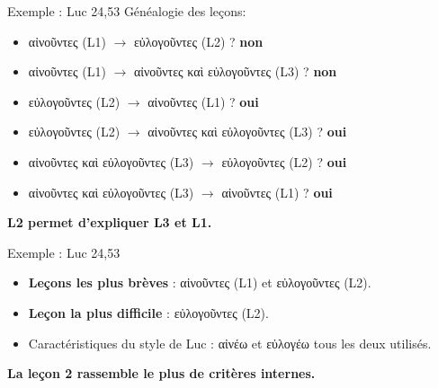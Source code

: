 \documentclass[11pt]{beamer}
\begin{document}
\begin{frame}{Exemple : Luc 24,53}
Généalogie des leçons:
    \begin{itemize}
        \item \textgreek{αἰνοῦντες} (L1) $\rightarrow$ \textgreek{εὐλογοῦντες} (L2) ? \pause
        \textbf{non}
        
        \item \textgreek{αἰνοῦντες} (L1) $\rightarrow$ \textgreek{αἰνοῦντες καὶ εὐλογοῦντες} (L3) ?
        \pause
        \textbf{non}
        
        \item \textgreek{εὐλογοῦντες} (L2) $\rightarrow$ \textgreek{αἰνοῦντες} (L1) ?
        \pause
        \textbf{oui}
        
        \item \textgreek{εὐλογοῦντες} (L2) $\rightarrow$ \textgreek{αἰνοῦντες καὶ εὐλογοῦντες} (L3) ?
        \pause 
        \textbf{oui}

        \item \textgreek{αἰνοῦντες καὶ εὐλογοῦντες} (L3) $\rightarrow$ \textgreek{εὐλογοῦντες} (L2) ?
        \pause
        \textbf{oui}
        
        
        \item \textgreek{αἰνοῦντες καὶ εὐλογοῦντες} (L3) $\rightarrow$ \textgreek{αἰνοῦντες} (L1) ?
        \pause
        \textbf{oui}
    \end{itemize}
    \textbf{L2 permet d'expliquer L3 et L1.}
\end{frame}

\begin{frame}{Exemple : Luc 24,53}
\begin{itemize}
    \item \textbf{Leçons les plus brèves} : 
    \pause
    \textgreek{αἰνοῦντες} (L1) et \textgreek{εὐλογοῦντες} (L2).
    \item \textbf{Leçon la plus difficile} : 
    \pause
    \textgreek{εὐλογοῦντες} (L2).
    \item Caractéristiques du style de Luc : \textgreek{αἰνέω} et \textgreek{εὐλογέω} tous les deux utilisés.
\end{itemize}

\begin{block}{}
    \textbf{La leçon 2 rassemble le plus de critères internes.}

\end{block}

\end{frame}
\end{document}
